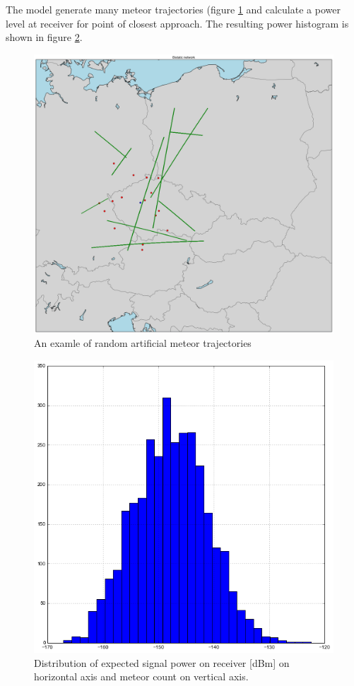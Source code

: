 \documentclass[twoside]{ctuthesis}
\theoremstyle{plain}
\theoremstyle{definition}
\theoremstyle{note}
\begin{document}
The model generate many meteor trajectories (figure \ref{VOR_meteors} and calculate a power level at receiver for point of closest approach. The resulting power histogram is shown in figure \ref{VOR_meteors_intensity}.

\begin{figure}
\includegraphics[width=\textwidth]{./img/Modeled_meteor_trajectories.png}
\caption{An examle of random artificial meteor trajectories}
\label{VOR_meteors}
\end{figure}


\begin{figure}
\includegraphics[width=\textwidth]{./img/Meteor_signal_intensity.png}
\caption{Distribution of expected signal power on receiver [dBm] on horizontal axis and meteor count on vertical axis.}
\label{VOR_meteors_intensity}
\end{figure}
\end{document}

